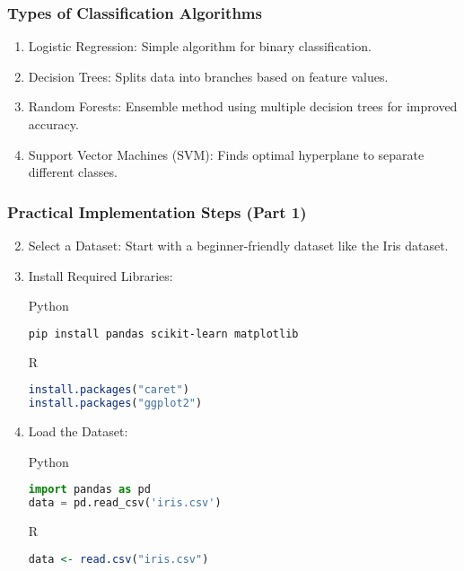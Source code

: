 \documentclass[aspectratio=169]{beamer}
\begin{document}
\begin{frame}[fragile]
    \frametitle{Types of Classification Algorithms}
    \begin{enumerate}
        \item Logistic Regression: Simple algorithm for binary classification.
        \item Decision Trees: Splits data into branches based on feature values.
        \item Random Forests: Ensemble method using multiple decision trees for improved accuracy.
        \item Support Vector Machines (SVM): Finds optimal hyperplane to separate different classes.
    \end{enumerate}
\end{frame}

\begin{frame}[fragile]
    \frametitle{Practical Implementation Steps (Part 1)}
    \begin{enumerate}
        \setcounter{enumi}{1} %
        \item Select a Dataset: Start with a beginner-friendly dataset like the Iris dataset.
        \item Install Required Libraries:
        \begin{block}{Python}
            \begin{lstlisting}[language=bash]
pip install pandas scikit-learn matplotlib
            \end{lstlisting}
        \end{block}
        \begin{block}{R}
            \begin{lstlisting}[language=R]
install.packages("caret")
install.packages("ggplot2")
            \end{lstlisting}
        \end{block}
        \item Load the Dataset:
        \begin{block}{Python}
            \begin{lstlisting}[language=Python]
import pandas as pd
data = pd.read_csv('iris.csv')
            \end{lstlisting}
        \end{block}
        \begin{block}{R}
            \begin{lstlisting}[language=R]
data <- read.csv("iris.csv")
            \end{lstlisting}
        \end{block}
    \end{enumerate}
\end{frame}
\end{document}
